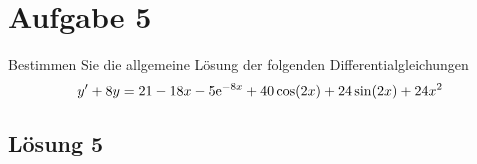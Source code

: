 \documentclass[main.tex]{subfiles}
\begin{document}
\section{Aufgabe 5}
Bestimmen Sie die allgemeine Lösung der folgenden Differentialgleichungen
\[
    y' + 8y = 21 - 18x - 5\mathrm{e}^{-8x} + 40\cos(2x) + 24\sin(2x) + 24x^2
\]

\subsection{Lösung 5}
\end{document}
